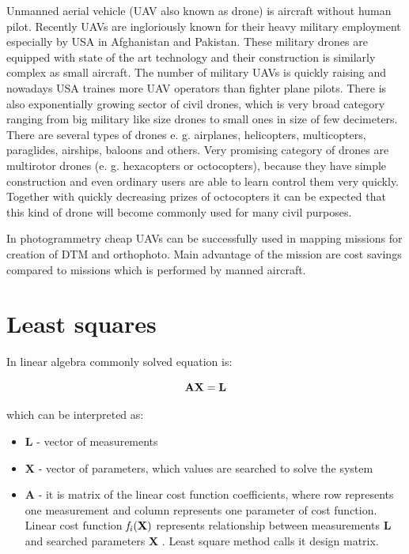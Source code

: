\documentclass[a4paper,12pt]{report}
\newcommand{\ematr}[1]{
{\bf #1}
}
\newcommand{\evect}[1]{
{\bf #1}
}
\newcommand{\efunc}[1]{
{\it #1}
}
\begin{document}
Unmanned aerial vehicle (UAV also known as drone) is aircraft without human pilot. Recently UAVs are ingloriously known for
their heavy military employment especially by USA in Afghanistan and Pakistan. These military drones are equipped with state of the art 
technology and their construction is similarly complex as small aircraft.  
The number of military UAVs is quickly raising and nowadays USA traines more UAV operators than fighter plane pilots. 
There is also exponentially growing sector of civil drones, which is very broad category ranging
from big military like size drones to small ones in size of few decimeters. There are several types of drones e. g. airplanes,
helicopters, multicopters, paraglides, airships, baloons and others. 
Very promising category of drones are multirotor drones (e. g. hexacopters or octocopters), because they have simple construction and 
even ordinary users are able to learn control them very quickly. Together with quickly decreasing prizes of octocopters it can be expected 
that this kind of drone will become commonly used for many civil purposes.

In photogrammetry cheap UAVs can be successfully used in mapping missions for creation of DTM and orthophoto.
Main advantage of the mission are cost savings compared to missions which is performed by manned aircraft.

\section{Least squares}
\label{sec:least}


In linear algebra commonly solved equation is:

\begin{equation}
\label{eq:linear_eq}
\ematr{A}\evect{X} = \evect{L} 
\end{equation} 

which can be interpreted as:
\begin{itemize}
\item \evect{L} - vector of measurements
\item \evect{X} - vector of parameters, which values are searched to solve the system
\item \ematr{A} - it is matrix of the linear cost function  coefficients,  where row represents one measurement 
		  and column represents one parameter of cost function. Linear cost function $\efunc{f_{i}(\evect{X})}$
		  represents relationship between measurements \evect{L} and searched parameters \evect{X}. 
		  Least square method calls it design matrix. 
\end{itemize}
\end{document}
